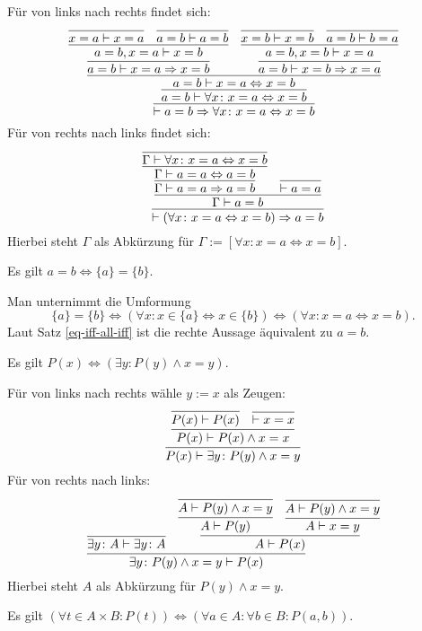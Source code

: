 \begin{Beweis}
Für von links nach rechts findet sich:
\[
\infer{\vdash a=b\Rightarrow\forall x\colon x=a\Leftrightarrow x=b}{
  \infer{a=b\vdash\forall x\colon x=a\Leftrightarrow x=b}{
    \infer{a=b\vdash x=a\Leftrightarrow x=b}{
      \infer{a=b\vdash x=a\Rightarrow x=b}{
        \infer{a=b,x=a\vdash x=b}{
          \infer{x=a\vdash x=a}{} & \infer{a=b\vdash a=b}{}}}
    & \infer{a=b\vdash x=b\Rightarrow x=a}{
        \infer{a=b,x=b\vdash x=a}{
          \infer{x=b\vdash x=b}{} & \infer{a=b\vdash b=a}{}}}}}}
\]
Für von rechts nach links findet sich:
\[
\infer{\vdash(\forall x\colon x=a\Leftrightarrow x=b)\Rightarrow a=b}{
  \infer{\Gamma\vdash a=b}{
    \infer{\Gamma\vdash a=a\Rightarrow a=b}{
      \infer{\Gamma\vdash a=a\Leftrightarrow a=b}{
        \infer{\Gamma\vdash\forall x\colon x=a\Leftrightarrow x=b}{}}}
  & \infer{\vdash a=a}{}}}
\]
Hierbei steht $\Gamma$ als Abkürzung für
$\Gamma:=[\forall x\colon x=a\Leftrightarrow x=b]$.\,\qedsymbol
\end{Beweis}

\begin{Satz}
Es gilt $a=b\iff\{a\}=\{b\}$.
\end{Satz}

\begin{Beweis}
Man unternimmt die Umformung
\[\{a\}=\{b\}\iff (\forall x\colon x\in\{a\}\Leftrightarrow x\in\{b\})
\iff (\forall x\colon x=a\Leftrightarrow x=b).\]
Laut Satz \ref{eq-iff-all-iff} ist die rechte Aussage
äquivalent zu $a=b$.\;\qedsymbol
\end{Beweis}

\begin{Satz}\label{eq-substitution}
Es gilt $P(x)\iff (\exists y\colon P(y)\land x=y)$.
\end{Satz}
\begin{Beweis}
Für von links nach rechts wähle $y:=x$ als Zeugen:
\[
\infer{P(x)\vdash\exists y\colon P(y)\land x=y}{
  \infer{P(x)\vdash P(x)\land x=x}{
    \infer{P(x)\vdash P(x)}{}
  & \infer{\vdash x=x}{}}}
\]
Für von rechts nach links:
\[
\infer{\exists y\colon P(y)\land x=y\vdash P(x)}{
  \infer{\exists y\colon A\vdash\exists y\colon A}{}
& \infer{A\vdash P(x)}{
    \infer{A\vdash P(y)}{
      \infer{A\vdash P(y)\land x=y}{}}
  & \infer{A\vdash x=y}{
      \infer{A\vdash P(y)\land x=y}{}}}}
\]
Hierbei steht $A$ als Abkürzung für $P(y)\land x=y$.\,\qedsymbol
\end{Beweis}

\begin{Satz}\label{all-cart}
Es gilt
$(\forall t \in A{\times}B\colon P(t))
\Leftrightarrow (\forall a{\in}A\colon\forall b{\in}B\colon P(a,b))$.
\end{Satz}

